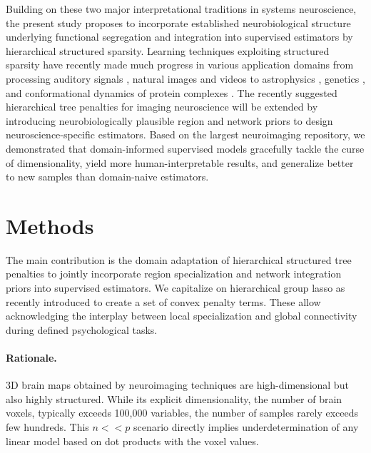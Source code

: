 \documentclass{article}
\begin{document}
Building on these two major interpretational traditions in systems neuroscience,
the present study proposes to incorporate
established neurobiological structure underlying
functional segregation and integration
into supervised estimators
by hierarchical structured sparsity.
%
Learning techniques
exploiting structured sparsity 
have recently made much progress in various application domains
from processing auditory signals \cite{daudet2004sparse},
natural images \cite{harzallah2009combining} and
videos \cite{kang2015structured}
to
astrophysics \cite{vinci2014estimating},
genetics \cite{kim2012tree},
and
conformational dynamics of protein complexes \cite{jenatton2009structured}.
%
The recently suggested hierarchical tree penalties for imaging neuroscience
\cite{jenatton2011multi} will be extended
by introducing neurobiologically plausible region and network priors
to design neuroscience-specific estimators.
%
Based on the largest neuroimaging repository,
we demonstrated that domain-informed supervised models
gracefully tackle the curse of dimensionality,
yield more human-interpretable results,
and generalize better to new samples
than domain-naive estimators.

\section{Methods}
The main contribution is the domain adaptation of hierarchical structured
tree penalties to jointly incorporate region 
specialization and network integration priors into supervised 
estimators.
We capitalize on hierarchical group lasso as recently introduced
\cite{jenatton2011structured} to create a set of convex penalty terms.
These allow acknowledging the interplay between local specialization and 
global connectivity during defined psychological tasks.
%
\paragraph{Rationale.}
3D brain maps obtained by neuroimaging
techniques are high-dimensional but also highly structured.
While its explicit dimensionality, the number of brain voxels,
typically exceeds 100,000 variables, the number
of samples rarely exceeds few hundreds.
This \(n << p\) scenario directly implies underdetermination of any
linear model based on dot products with the voxel values.
\end{document}
